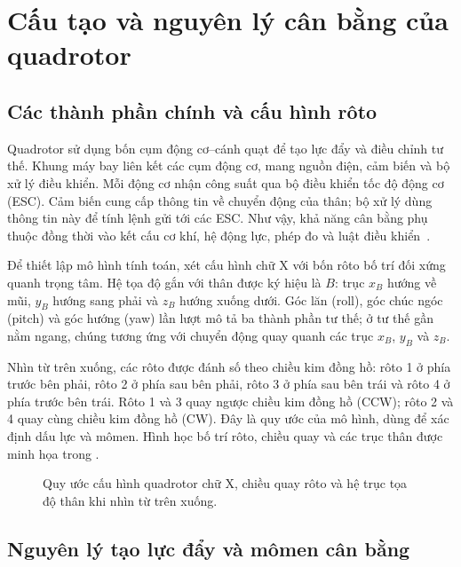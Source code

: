 \section{Cấu tạo và nguyên lý cân bằng của quadrotor}
\label{sec:background-principle}

\subsection{Các thành phần chính và cấu hình rôto}
\label{subsec:background-configuration}

Quadrotor sử dụng bốn cụm động cơ--cánh quạt để tạo lực đẩy và điều chỉnh tư thế. Khung máy bay liên kết các cụm động cơ, mang nguồn điện, cảm biến và bộ xử lý điều khiển. Mỗi động cơ nhận công suất qua bộ điều khiển tốc độ động cơ (ESC). Cảm biến cung cấp thông tin về chuyển động của thân; bộ xử lý dùng thông tin này để tính lệnh gửi tới các ESC. Như vậy, khả năng cân bằng phụ thuộc đồng thời vào kết cấu cơ khí, hệ động lực, phép đo và luật điều khiển~\cite{chovancova2014mathematical}.

Để thiết lập mô hình tính toán, xét cấu hình chữ X với bốn rôto bố trí đối xứng quanh trọng tâm. Hệ tọa độ gắn với thân được ký hiệu là $B$: trục $x_B$ hướng về mũi, $y_B$ hướng sang phải và $z_B$ hướng xuống dưới. Góc lăn (roll), góc chúc ngóc (pitch) và góc hướng (yaw) lần lượt mô tả ba thành phần tư thế; ở tư thế gần nằm ngang, chúng tương ứng với chuyển động quay quanh các trục $x_B$, $y_B$ và $z_B$.

Nhìn từ trên xuống, các rôto được đánh số theo chiều kim đồng hồ: rôto 1 ở phía trước bên phải, rôto 2 ở phía sau bên phải, rôto 3 ở phía sau bên trái và rôto 4 ở phía trước bên trái. Rôto 1 và 3 quay ngược chiều kim đồng hồ (CCW); rôto 2 và 4 quay cùng chiều kim đồng hồ (CW). Đây là quy ước của mô hình, dùng để xác định dấu lực và mômen. Hình học bố trí rôto, chiều quay và các trục thân được minh họa trong .

\begin{figure}[H]
	\centering
	\resizebox{\linewidth}{!}{}
	\caption{Quy ước cấu hình quadrotor chữ X, chiều quay rôto và hệ trục tọa độ thân khi nhìn từ trên xuống.}
	\label{fig:background-layout}
\end{figure}

\subsection{Nguyên lý tạo lực đẩy và mômen cân bằng}

